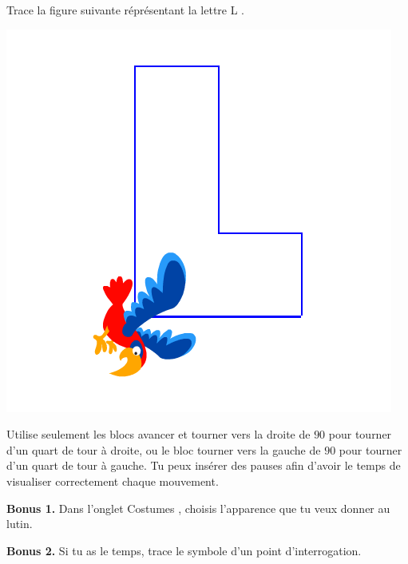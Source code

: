 \documentclass[class=report,crop=false, 12pt]{standalone}
\begin{document}
\begin{activite}

Trace la figure suivante réprésentant la lettre \og L \fg{}.

\begin{center}
\begin{minipage}{0.3\textwidth}
\includegraphics[width=\textwidth]{ecran-01-ex3}
\end{minipage}
\begin{minipage}{0.3\textwidth}
\end{minipage}
\begin{minipage}{0.3\textwidth}
\begin{scratch}
  \blockspace[1]
\end{scratch}
\end{minipage}  
\end{center} 

Utilise seulement les blocs \og avancer \fg{} et \og tourner vers la droite de $90$\textdegree \fg{} pour tourner d'un quart de tour à droite, ou le bloc \og tourner vers la gauche de $90$\textdegree \fg{} pour tourner d'un quart de tour à  gauche. Tu peux insérer des pauses afin d'avoir le temps de visualiser correctement chaque mouvement.

\bigskip

\textbf{Bonus 1.} Dans l'onglet \og Costumes \fg{}, choisis l'apparence que tu veux donner au lutin.

\textbf{Bonus 2.} Si tu as le temps, trace le symbole d'un point d'interrogation.



\end{activite}
\end{document}

